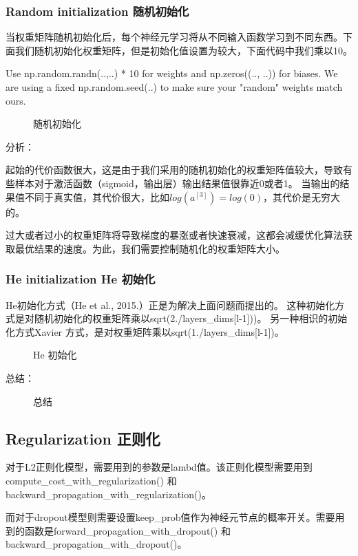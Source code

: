 \documentclass[UTF8]{ctexart}
\begin{document}
\subsubsection{Random initialization 随机初始化}
当权重矩阵随机初始化后，每个神经元学习将从不同输入函数学习到不同东西。下面我们随机初始化权重矩阵，但是初始化值设置为较大，下面代码中我们乘以10。

Use np.random.randn(..,..) * 10 for weights and np.zeros((.., ..)) for biases. We are using a fixed np.random.seed(..)
to make sure your "random" weights match ours.
\begin{figure}[htb]
 \caption{随机初始化}
  \label{fig:15}
 \end{figure}

 分析：

 起始的代价函数很大，这是由于我们采用的随机初始化的权重矩阵值较大，导致有些样本对于激活函数（sigmoid，输出层）输出结果值很靠近0或者1。
 当输出的结果值不同于真实值，其代价很大，比如$log(a^{[3]})=log(0)$，其代价是无穷大的。

过大或者过小的权重矩阵将导致梯度的暴涨或者快速衰减，这都会减缓优化算法获取最优结果的速度。为此，我们需要控制随机化的权重矩阵大小。

\subsubsection{He initialization He 初始化}
 He初始化方式（He et al., 2015.）正是为解决上面问题而提出的。
 这种初始化方式是对随机初始化的权重矩阵乘以sqrt(2./layers\_dims[l-1]))。
 另一种相识的初始化方式Xavier 方式，是对权重矩阵乘以sqrt(1./layers\_dims[l-1])。
 \begin{figure}[htb]
  \caption{He 初始化}
   \label{fig:16}
  \end{figure}

总结：
\begin{figure}[htb]
 \caption{总结}
  \label{fig:17}
 \end{figure}

 \subsection{Regularization 正则化}
 对于L2正则化模型，需要用到的参数是lambd值。该正则化模型需要用到compute\_cost\_with\_regularization()
 和backward\_propagation\_with\_regularization()。

 而对于dropout模型则需要设置keep\_prob值作为神经元节点的概率开关。需要用到的函数是forward\_propagation\_with\_dropout()
 和backward\_propagation\_with\_dropout()。
\end{document}
